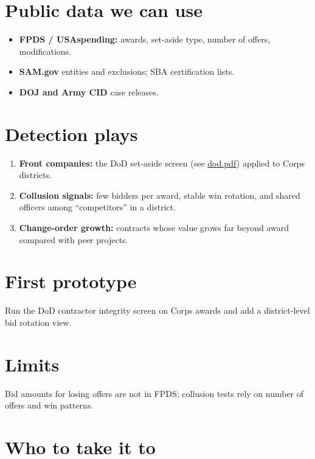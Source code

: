 \documentclass[letterpaper,11pt]{article}
\providecommand{\tightlist}{\setlength{\itemsep}{0pt}\setlength{\parskip}{0pt}}
\begin{document}
\hypertarget{public-data-we-can-use}{%
\section{Public data we can use}\label{public-data-we-can-use}}

\begin{itemize}
\tightlist
\item
  \textbf{FPDS / USAspending:} awards, set-aside type, number of offers,
  modifications.
\item
  \textbf{SAM.gov} entities and exclusions; SBA certification lists.
\item
  \textbf{DOJ and Army CID} case releases.
\end{itemize}

\hypertarget{detection-plays}{%
\section{Detection plays}\label{detection-plays}}

\begin{enumerate}
\def\labelenumi{\arabic{enumi}.}
\tightlist
\item
  \textbf{Front companies:} the DoD set-aside screen (see \url{dod.pdf})
  applied to Corps districts.
\item
  \textbf{Collusion signals:} few bidders per award, stable win
  rotation, and shared officers among ``competitors'' in a district.
\item
  \textbf{Change-order growth:} contracts whose value grows far beyond
  award compared with peer projects.
\end{enumerate}

\hypertarget{first-prototype}{%
\section{First prototype}\label{first-prototype}}

Run the DoD contractor integrity screen on Corps awards and add a
district-level bid rotation view.

\hypertarget{limits}{%
\section{Limits}\label{limits}}

Bid amounts for losing offers are not in FPDS; collusion tests rely on
number of offers and win patterns.

\hypertarget{who-to-take-it-to}{%
\section{Who to take it to}\label{who-to-take-it-to}}
\end{document}
